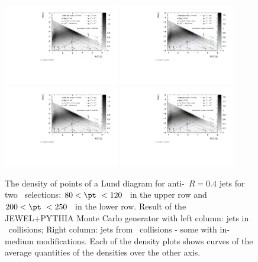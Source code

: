 \begin{figure}[htbp]
	\centering
	\includegraphics[width=0.45\textwidth,page=1]{figures/lund/lund_t}
	\includegraphics[width=0.45\textwidth,page=2]{figures/lund/lund_t}
	\includegraphics[width=0.45\textwidth,page=4]{figures/lund/lund_t}
	\includegraphics[width=0.45\textwidth,page=5]{figures/lund/lund_t}
	\caption{The density of points of a Lund diagram for anti-\kT\ $R=0.4$ jets for two \pt\ selections: $80 < \pt\ < 120$ \gevc\ in the upper row and $200 < \pt\ < 250$ \gevc\ in the lower row. Result of the JEWEL+PYTHIA Monte Carlo generator with left column: jets in \pp\ collisions; Right column: jets from \PbPb\ collisions - some with in-medium modifications. Each of the density plots shows curves of the average quantities of the densities over the other axis.}
	\label{fig:Lund_jets}
\end{figure}

